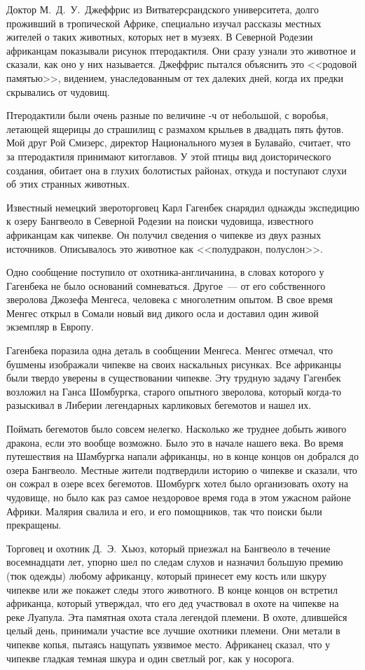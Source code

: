 \documentclass[12pt,a4paper,twoside,openany,svgnames]{memoir}
\begin{document}
Доктор М.~Д.~У.~Джеффрис из Витватерсрандского университета, долго проживший в тропической Африке, специально изучал рассказы местных жителей о таких животных, которых нет в музеях. В Северной Родезии африканцам показывали рисунок птеродактиля. Они сразу узнали это животное и сказали, как оно у них называется. Джеффрис пытался объяснить это <<родовой памятью>>, видением, унаследованным от тех далеких дней, когда их предки скрывались от чудовищ.

Птеродактили были очень разные по величине -ч от небольшой, с воробья, летающей ящерицы до страшилищ с размахом крыльев в двадцать пять футов. Мой друг Рой Смизерс, директор Национального музея в Булавайо, считает, что за птеродактиля принимают китоглавов. У этой птицы вид доисторического создания, обитает она в глухих болотистых районах, откуда и поступают слухи об этих странных животных.

Известный немецкий звероторговец Карл Гагенбек снарядил однажды экспедицию к озеру Бангвеоло в Северной Родезии на поиски чудовища, известного африканцам как чипекве. Он получил сведения о чипекве из двух разных источников. Описывалось это животное как <<полудракон, полуслон>>.

Одно сообщение поступило от охотника-англичанина, в словах которого у Гагенбека не было оснований сомневаться. Другое~--- от его собственного зверолова Джозефа Менгеса, человека с многолетним опытом. В свое время Менгес открыл в Сомали новый вид дикого осла и доставил один живой экземпляр в Европу.

Гагенбека поразила одна деталь в сообщении Менгеса. Менгес отмечал, что бушмены изображали чипекве на своих наскальных рисунках. Все африканцы были твердо уверены в существовании чипекве. Эту трудную задачу Гагенбек возложил на Ганса Шомбургка, старого опытного зверолова, который когда-то разыскивал в Либерии легендарных карликовых бегемотов и нашел их.

Поймать бегемотов было совсем нелегко. Насколько же труднее добыть живого дракона, если это вообще возможно. Было это в начале нашего века. Во время путешествия на Шамбургка напали африканцы, но в конце концов он добрался до озера Бангвеоло. Местные жители подтвердили историю о чипекве и сказали, что он сожрал в озере всех бегемотов. Шомбургк хотел было организовать охоту на чудовище, но было как раз самое нездоровое время года в этом ужасном районе Африки. Малярия свалила и его, и его помощников, так что поиски были прекращены.

Торговец и охотник Д.~Э.~Хьюз, который приезжал на Бангвеоло в течение восемнадцати лет, упорно шел по следам слухов и назначил большую премию (тюк одежды) любому африканцу, который принесет ему кость или шкуру чипекве или же покажет следы этого животного. В конце концов он встретил африканца, который утверждал, что его дед участвовал в охоте на чипекве на реке Луапула. Эта памятная охота стала легендой племени. В охоте, длившейся целый день, принимали участие все лучшие охотники племени. Они метали в чипекве копья, пытаясь нащупать уязвимое место. Африканец сказал, что у чипекве гладкая темная шкура и один светлый рог, как у носорога.
\end{document}
